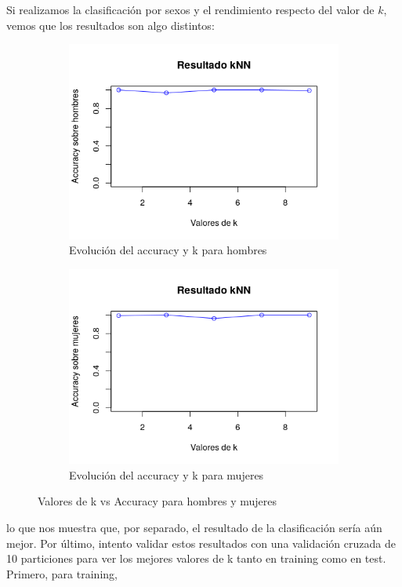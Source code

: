 Si realizamos la clasificación por sexos y el rendimiento respecto del valor de $k$, vemos que los resultados son algo distintos:

\begin{figure}[H]
	\centering
	\begin{subfigure}{.5\textwidth}
		\centering
		\includegraphics[width=.8\linewidth]{knn-k-h.png}
		\caption{Evolución del accuracy y k para hombres}
		\label{fig:k-h}
	\end{subfigure}%
	\begin{subfigure}{.5\textwidth}
		\centering
		\includegraphics[width=.8\linewidth]{knn-k-m.png}
		\caption{Evolución del accuracy y k para mujeres}
		\label{fig:k-m}
	\end{subfigure}
	\caption{Valores de k vs Accuracy para hombres y mujeres}
	\label{fig:k-h-m}
\end{figure}

lo que nos muestra que, por separado, el resultado de la clasificación sería aún mejor. Por último, intento validar estos resultados con una validación cruzada de 10 particiones para ver los mejores valores de k tanto en training como en test. Primero, para training,

